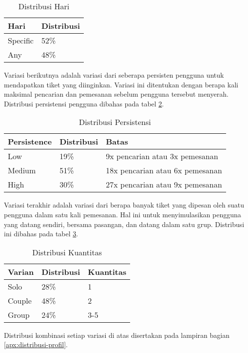 \begin{table}[h]
    \centering
    \caption{Distribusi Hari}
    \label{table:distribusi-hari}
    \begin{tabular}{|l|l|}
        \hline
        \textbf{Hari} & \textbf{Distribusi} \\
        \hline
        Specific      & 52\%                \\
        \hline
        Any           & 48\%                \\
        \hline
    \end{tabular}
\end{table}

Variasi berikutnya adalah variasi dari seberapa persisten pengguna untuk mendapatkan tiket yang diinginkan. Variasi ini ditentukan dengan berapa kali maksimal pencarian dan pemesanan sebelum pengguna tersebut menyerah. Distribusi persistensi pengguna dibahas pada tabel \ref{table:distribusi-persistensi}.

\begin{table}[h]
    \centering
    \caption{Distribusi Persistensi}
    \label{table:distribusi-persistensi}
    \begin{tabular}{|l|l|l|}
        \hline
        \textbf{Persistence} & \textbf{Distribusi} & \textbf{Batas}                      \\
        \hline
        Low                  & 19\%                & 9x pencarian atau 3x pemesanan      \\
        \hline
        Medium               & 51\%                & 18x pencarian atau 6x     pemesanan \\
        \hline
        High                 & 30\%                & 27x pencarian atau 9x pemesanan     \\
        \hline
    \end{tabular}
\end{table}

\pagebreak

Variasi terakhir adalah variasi dari berapa banyak tiket yang dipesan oleh suatu pengguna dalam satu kali pemesanan. Hal ini untuk menyimulasikan pengguna yang datang sendiri, bersama pasangan, dan datang dalam satu grup. Distribusi ini dibahas pada tabel \ref{table:distribusi-kuantitas}.

\begin{table}[h]
    \centering
    \caption{Distribusi Kuantitas}
    \label{table:distribusi-kuantitas}
    \begin{tabular}{|l|l|l|}
        \hline
        \textbf{Varian} & \textbf{Distribusi} & \textbf{Kuantitas} \\
        \hline
        Solo            & 28\%                & 1                  \\
        \hline
        Couple          & 48\%                & 2                  \\
        \hline
        Group           & 24\%                & 3-5                \\
        \hline
    \end{tabular}
\end{table}

Distribusi kombinasi setiap variasi di atas disertakan pada lampiran bagian \ref{apx:distribusi-profil}.